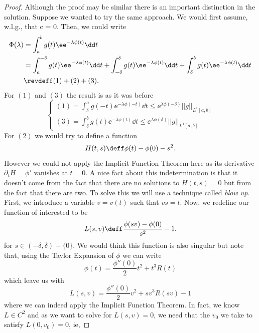 \begin{proof}
	Although the proof may be similar there is an important distinction in the solution. Suppose we wanted to try the same approach. We would first assume, w.l.g., that c = 0. Then, we could write
	\begin{align}
	\Phi(\lambda) & = \int_{a}^{b} g(t) \ee^{-\lambda \phi(t)} \dd t \\ 
	& = \int_{a}^{-\delta} g(t) \ee^{-\lambda \phi(t)} \dd t + \int_{-\delta}^{\delta} g(t) \ee^{-\lambda \phi(t)} \dd t + \int_{\delta}^{b} g(t) \ee^{-\lambda \phi(t)} \dd t\\
	&  \revdeff (1) + (2) + (3).		
	\end{align}
	For $(1)$ and $(3)$ the result is as it was before
	\begin{equation}
		\begin{cases}
			(1)	= \int_{\delta}^{a} g(-t) \ee^{-\lambda \phi(-t)} \dd t \leq \ee^{\lambda \phi(-\delta)} ||g||_{L^1[a,b]}\\
			(3) = \int_{\delta}^{b} g(t) \ee^{-\lambda \phi(t)} \dd t \leq \ee^{\lambda \phi(\delta)} ||g||_{L^1[a,b]}
		\end{cases}
	\end{equation}
	For $(2)$ we would try to define a function
	\begin{equation}
		H(t,s) \deff \phi(t) - \phi(0) - s^2.		
	\end{equation} 
	However we could not apply the Implicit Function Theorem here as its derivative $\partial_t H = \phi'$ vanishes at $t=0$. A nice fact about this indetermination is that it doesn't come from the fact that there are no solutions to $H(t,s) = 0$ but from the fact that there are two. To solve this we will use a technique called \textit{blow up}. First, we introduce a variable $v = v(t)$ such that $vs = t$. Now, we redefine our function of interested to be
	\begin{equation}
		L(s, v) \deff \frac{\phi(sv) - \phi(0)}{s^2} - 1.		
	\end{equation}
	for $s\in(-\delta, \delta) - \{0\}$. We would think this function is also singular but note that, using the Taylor Expansion of $\phi$ we can write
	\begin{equation}
		\phi(t) = \frac{\phi''(0)}{2}t^2 + t^3R(t)
	\end{equation}	
	which leave us with 
	\begin{equation}
		L(s, v) = \frac{\phi''(0)}{2}v^2 + sv^3R(sv) - 1
	\end{equation}
	where we can indeed apply the Implicit Function Theorem. In fact, we know $L \in C^2$ and as we want to solve for $L(s,v) = 0$, we need that the $v_0$ we take to satisfy $L(0, v_0) = 0$, ie,

\end{proof}
